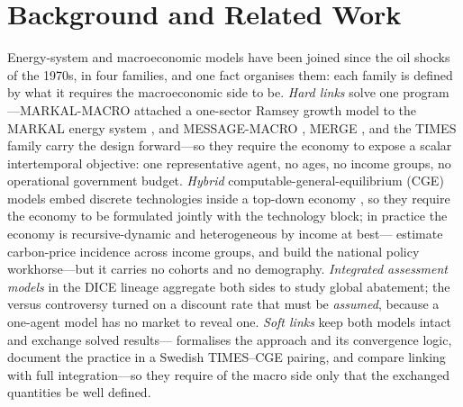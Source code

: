\section{Background and Related Work}
\label{sec:background}


Energy-system and macroeconomic models have been joined since the oil shocks of the
1970s, in four families, and one fact organises them: each family is
defined by what it requires the macroeconomic side to be. \emph{Hard links} solve one
program---MARKAL-MACRO attached a one-sector Ramsey growth model to the MARKAL energy
system \citep{manne_wene_1992}, and MESSAGE-MACRO \citep{messner_schrattenholzer_2000},
MERGE \citep{manne_merge_1995}, and the TIMES family \citep{loulou_times_2008} carry
the design forward---so they require the economy to expose a scalar intertemporal
objective: one representative agent, no ages, no income groups, no operational
government budget. \emph{Hybrid} computable-general-equilibrium (CGE) models embed
discrete technologies inside a top-down economy
\citep{bohringer_rutherford_2008,hourcade_hybrid_2006}, so they require the economy
to be formulated jointly with the technology block; in practice the economy is
recursive-dynamic and heterogeneous by income at best---\citet{rausch_2011} estimate
carbon-price incidence across income groups, and \citet{goulder_hafstead_2017} build
the national policy workhorse---but it carries no cohorts and no demography.
\emph{Integrated assessment models} in the DICE lineage \citep{nordhaus_dice_2008}
aggregate both sides to study global abatement; the \citet{stern_2007} versus
\citet{nordhaus_stern_2007} controversy turned on a discount rate that must be
\emph{assumed}, because a one-agent model has no market to reveal one. \emph{Soft
links} keep both models intact and exchange solved results---\citet{wene_1996}
formalises the approach and its convergence logic, \citet{krook_riekkola_2017}
document the practice in a Swedish TIMES--CGE pairing, and
\citet{helgesen_tomasgard_2018} compare linking with full integration---so they
require of the macro side only that the exchanged quantities be well defined.

